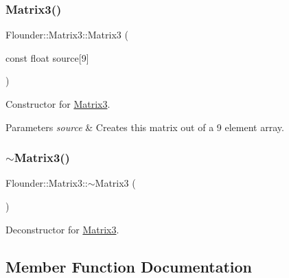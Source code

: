 \subsubsection{\texorpdfstring{Matrix3()}{Matrix3()}\hspace{0.1cm}{\footnotesize\ttfamily [3/3]}}
{\footnotesize\ttfamily Flounder\+::\+Matrix3\+::\+Matrix3 (\begin{DoxyParamCaption}\item[{const float}]{source\mbox{[}9\mbox{]} }\end{DoxyParamCaption})}



Constructor for \hyperlink{class_flounder_1_1_matrix3}{Matrix3}. 


\begin{DoxyParams}{Parameters}
{\em source} & Creates this matrix out of a 9 element array. \\
\hline
\end{DoxyParams}
\mbox{\label{class_flounder_1_1_matrix3_aefb483862a51bd5806cbba551cca964e}} 
\subsubsection{\texorpdfstring{$\sim$\+Matrix3()}{~Matrix3()}}
{\footnotesize\ttfamily Flounder\+::\+Matrix3\+::$\sim$\+Matrix3 (\begin{DoxyParamCaption}{ }\end{DoxyParamCaption})}



Deconstructor for \hyperlink{class_flounder_1_1_matrix3}{Matrix3}. 



\subsection{Member Function Documentation}
\mbox{\label{class_flounder_1_1_matrix3_adb3c2ad1292e3c6f82ef98b1b107f6b0}} 
